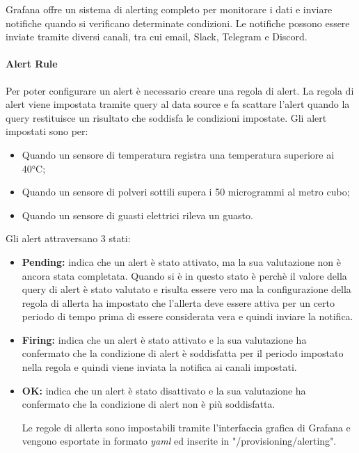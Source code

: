 Grafana offre un sistema di alerting completo per monitorare i dati e inviare notifiche quando si verificano determinate condizioni. Le notifiche possono essere inviate tramite diversi canali, tra cui email, Slack, Telegram e Discord.

\paragraph{Alert Rule}
Per poter configurare un alert è necessario creare una regola di alert. La regola di alert viene impostata tramite query al data source e fa scattare l'alert quando la query restituisce un risultato che soddisfa le condizioni impostate.
Gli alert impostati sono per:
\begin{itemize}
    \item Quando un sensore di temperatura registra una temperatura superiore ai 40°C;
    \item Quando un sensore di polveri sottili supera i 50 microgrammi al metro cubo;
    \item Quando un sensore di guasti elettrici rileva un guasto.
\end{itemize}

Gli alert attraversano 3 stati:
\begin{itemize}
    \item \textbf{Pending:} indica che un alert è stato attivato, ma la sua valutazione non è ancora stata completata.
                            Quando si è in questo stato è perchè il valore della query di alert è stato valutato e risulta essere vero ma la configurazione della regola di allerta ha impostato che l'allerta deve essere attiva per un certo periodo di tempo prima di essere considerata vera e quindi inviare la notifica.
\item \textbf{Firing:}  indica che un alert è stato attivato e la sua valutazione ha confermato che la condizione di alert è soddisfatta per il periodo impostato nella regola e quindi viene inviata la notifica ai canali impostati.
\item \textbf{OK:} indica che un alert è stato disattivato e la sua valutazione ha confermato che la condizione di alert non è più soddisfatta.

Le regole di allerta sono impostabili tramite l'interfaccia grafica di Grafana e vengono esportate in formato \textit{yaml} ed inserite in "/provisioning/alerting".
                            
\end{itemize}

